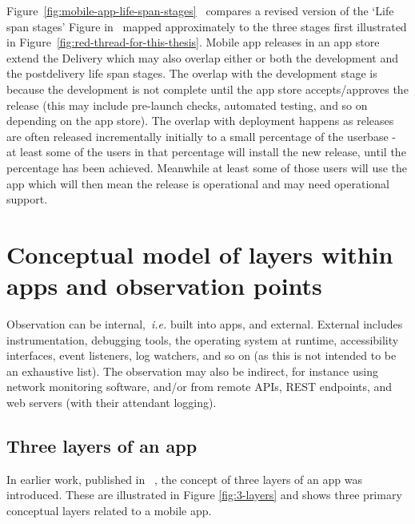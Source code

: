 Figure~\ref{fig:mobile-app-life-span-stages}~ compares a revised version of the `Life span stages' Figure in~ mapped approximately to the three stages first illustrated in Figure~\ref{fig:red-thread-for-this-thesis}. Mobile app releases in an app store extend the Delivery which may also overlap either or both the development and the postdelivery life span stages. The overlap with the development stage is because the development is not complete until the app store accepts/approves the release (this may include pre-launch checks, automated testing, and so on depending on the app store). The overlap with deployment happens as releases are often released incrementally initially to a small percentage of the userbase - at least some of the users in that percentage will install the new release, until the percentage has been achieved. Meanwhile at least some of those users will use the app which will then mean the release is operational and may need operational support.


\section{Conceptual model of layers within apps and observation points}
Observation can be internal,~\emph{i.e.} built into apps, and external. External includes instrumentation, debugging tools, the operating system at runtime, accessibility interfaces, event listeners, log watchers, and so on (as this is not intended to be an exhaustive list). The observation may also be indirect, for instance using network monitoring software, and/or from remote APIs, REST endpoints, and web servers (with their attendant logging).

\subsection{Three layers of an app}
In earlier work, published in ~, the concept of three layers of an app was introduced. These are illustrated in Figure \ref{fig:3-layers} and shows three primary conceptual layers related to a mobile app. 


